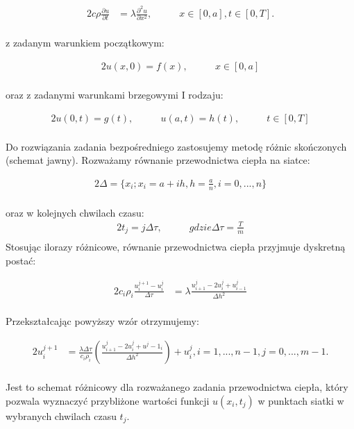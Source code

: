 \documentclass[twoside]{projektInzynierskiMS1}
\newcommand{\si}{ś}
\begin{document}
\begin{alignat*}{2}
c\rho \frac{\partial u}{\partial t}&= \lambda \frac{\partial^2 u}{\partial x^2},&\qquad  x \in [0, a], t \in [0, T].\\
\end{alignat*}

z zadanym warunkiem początkowym:

\begin{alignat*}{2}
u(x, 0) = f(x),&\qquad  x \in [0, a]\\
\end{alignat*}

oraz z zadanymi warunkami brzegowymi I rodzaju:

\begin{alignat*}{2}
u(0,t) = g(t),&\qquad  u(a, t) = h(t), &\qquad t \in [0, T]\\
\end{alignat*}

Do rozwiązania zadania bezpośredniego zastosujemy metodę różnic skończonych (schemat jawny).
Rozważamy równanie przewodnictwa ciepła na siatce:

\begin{alignat*}{2}
\Delta = \{ x_i; x_i = a + ih, h = \frac{a}{n},  i=0, ..., n\}\\
\end{alignat*}

oraz w kolejnych chwilach czasu:
\begin{alignat*}{2}
t_j = j \Delta \tau, &\qquad gdzie \Delta \tau = \frac{T}{m}\\
\end{alignat*}
Stosując ilorazy różnicowe, równanie przewodnictwa ciepła przyjmuje dyskretną postać:

\begin{alignat*}{2}
c_i \rho _i \frac{ u^{j+1}_i - u^j_i}{ \Delta \tau}&= \lambda \frac{ u^j_{i+1} - 2u^j_i+u^j_{i-1}}{\Delta h^2}\\
\end{alignat*}

Przekształcając powyższy wzór otrzymujemy:

\begin{alignat*}{2}
 u^{j+1}_i&= \frac{\lambda \Delta \tau}{c_i \rho _i} \left( \frac{u^j_{i+1} - 2u^j_i+u^j-1_i}{\Delta h^2} \right) + u^j_i, i=1, ..., n-1, j =0, ..., m-1.\\
\end{alignat*}

Jest to schemat różnicowy dla rozważanego zadania przewodnictwa ciepła, który pozwala wyznaczyć przybliżone warto\si ci funkcji $u(x_i, t_j)$ w punktach siatki w wybranych chwilach czasu $t_j$.
\end{document}
